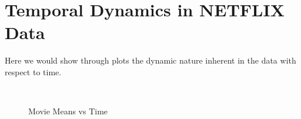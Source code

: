 \section{Temporal Dynamics in NETFLIX Data}
Here we would show through plots the dynamic nature inherent in the data with
respect to time. 


\begin{figure}[h]
\centering
{}
\\

\label{fig:MovieMean_temporal}
\caption{Movie Means vs Time}
\end{figure}



